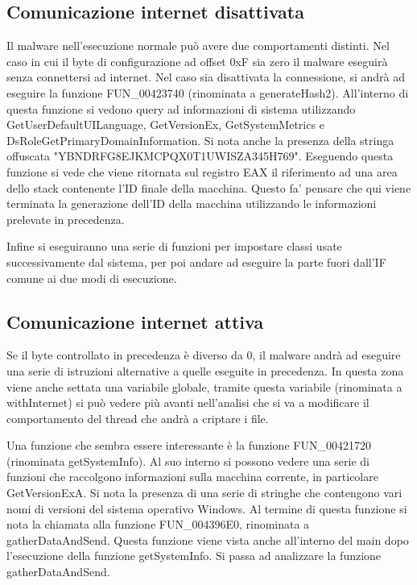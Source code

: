 \documentclass[a4paper,12pt]{article}
\begin{document}
\subsection{Comunicazione internet disattivata}
Il malware nell'esecuzione normale può avere due comportamenti distinti. Nel caso in cui il byte di configurazione ad offset 0xF sia zero il malware eseguirà senza connettersi ad internet. 
Nel caso sia disattivata la connessione, si andrà ad eseguire la funzione FUN\_00423740 (rinominata a generateHash2). All'interno di questa funzione si vedono query ad informazioni di sistema utilizzando GetUserDefaultUILanguage, GetVersionEx, GetSystemMetrics e DsRoleGetPrimaryDomainInformation. Si nota anche la presenza della stringa offuscata "YBNDRFG8EJKMCPQX0T1UWISZA345H769". Eseguendo questa funzione si vede che viene ritornata sul registro EAX il riferimento ad una area dello stack contenente l'ID finale della macchina. Questo fa' pensare che qui viene terminata la generazione dell'ID della macchina utilizzando le informazioni prelevate in precedenza.

Infine si eseguiranno una serie di funzioni per impostare classi usate successivamente dal sistema, per poi andare ad eseguire la parte fuori dall'IF comune ai due modi di esecuzione.  

\subsection{Comunicazione internet attiva}
Se il byte controllato in precedenza è diverso da 0, il malware andrà ad eseguire una serie di istruzioni alternative a quelle eseguite in precedenza.  In questa zona viene anche settata una variabile globale, tramite questa variabile (rinominata a withInternet) si può vedere più avanti nell'analisi che si va a modificare il comportamento del thread che andrà a criptare i file. 

Una funzione che sembra essere interessante è la funzione FUN\_00421720 (rinominata getSystemInfo). Al suo interno si possono vedere una serie di funzioni che raccolgono informazioni sulla macchina corrente, in particolare GetVersionExA. Si nota la presenza di una serie di stringhe che contengono vari nomi di versioni del sistema operativo Windows. Al termine di questa funzione si nota la chiamata alla funzione FUN\_004396E0, rinominata a gatherDataAndSend. Questa funzione viene vista anche all'interno del main dopo l'esecuzione della funzione getSystemInfo. Si passa ad analizzare la funzione gatherDataAndSend.
\end{document}
